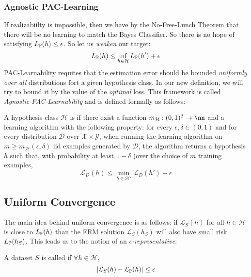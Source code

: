 \documentclass[11pt]{scrartcl}
\begin{document}
\subsubsection{Agnostic PAC-Learning}
If realizabiilty is impossible, then we have by the No-Free-Lunch Theorem that there will be no learning to match the Bayes Classifier. So there is no hope of satisfying $L_{\mathbb{P}}(h) \le \epsilon$. So let us \textit{weaken} our target:
$$L_{\mathbb{P}}(h) \le \inf_{h \in \mathcal{H}}L_{\mathbb{P}}(h')+\epsilon$$
PAC-Learnability requites that the estimation error should be bounded \textit{uniformly over all} distributions fort a given hypothesis class. In our new definition, we will try to bound it by the value of the \textit{optimal} loss. This framework is called \textit{Agnostic PAC-Learnability} and is defined formally as follows:
\begin{defn}
A hypothesis class $\mathcal{H}$ is  if there exist a function $m_{\mathcal{H}}:(0,1)^2 \to \nn$ and a learning algorithm with the following property: for every $\epsilon, \delta \in (0,1)$ and for every distribution $\mathcal{D}$ over $\mathcal{X} \times \mathcal{Y}$, when running the learning algorithm on $m \ge m_{\mathcal{H}}(\epsilon, \delta)$ iid examples generated by $\mathcal{D}$, the algorithm returns a hypothesis $h$ such that, with probability at least $1-\delta$ (over the choice of $m$ training examples, $$\mathcal{L}_{D}(h) \le \min_{h \in \mathcal{H'}}\mathcal{L}_{D}(h')+\epsilon$$
\end{defn}

\subsection{Uniform Convergence}
The main idea behind uniform convergence is as follows: if $\mathcal{L}_{S}(h)$ for all $h \in \mathcal{H}$ is close to $L_{\mathbb{P}}(h)$ than the ERM solution $\mathcal{L}_{S}(h_S)$ will also have small risk $L_{\mathbb{P}}(h_S)$. This leads us to the notion of an \textit{$\epsilon$-representative}:
\begin{defn}
A dataset $S$ is called  if $\forall{h} \in \mathcal{H}$, $$|\mathcal{L}_{S}(h)-\mathcal{L}_{\mathbb{P}}(h)| \le \epsilon$$
\end{defn}
\end{document}
